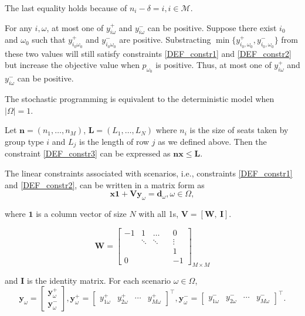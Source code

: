 
The last equality holds because of $n_i- \delta = i, i \in \mathcal{M}$. 

\begin{remark}
For any $i, \omega$, at most one of $y_{i \omega}^{+}$ and $y_{i \omega}^{-}$ can be positive. 
Suppose there exist $i_0$ and $\omega_0$ such that $y_{i_0 \omega_0}^{+}$ and $y_{i_0 \omega_0}^{-}$ are positive. Substracting $\min\{y_{i_0, \omega_0}^{+}, y_{i_0, \omega_0}^{-}\}$ from these two values will still satisfy constraints \eqref{DEF_constr1} and \eqref{DEF_constr2} but increase the objective value when $p_{\omega_0}$ is positive. Thus, at most one of $y_{i \omega}^{+}$ and $y_{i \omega}^{-}$ can be positive. 
\end{remark}

\begin{prop}\label{prop_onescenario}
  The stochastic programming is equivalent to the deterministic model when $|\Omega| =1$.
\end{prop}

Let $\mathbf{n} = (n_1, \ldots, n_M)$, $\mathbf{L} = (L_1, \ldots, L_N)$ where $n_i$ is the size of seats taken by group type $i$ and $L_j$ is the length of row $j$ as we defined above. Then the constraint \eqref{DEF_constr3} can be expressed as $\mathbf{n} \mathbf{x} \leq \mathbf{L}$.

The linear constraints associated with scenarios, i.e., constraints \eqref{DEF_constr1} and \eqref{DEF_constr2}, can be written in a matrix form as
\[\mathbf{x} \mathbf{1} + \mathbf{V} \mathbf{y}_\omega = \mathbf{d}_\omega, \omega\in \Omega,\]

where $\mathbf{1}$ is a column vector of size $N$ with all 1s, $\mathbf{V} = [\mathbf{W}, ~\mathbf{I}]$.

$$
\mathbf{W}=\left[\begin{array}{ccccc}
-1 & 1 & \ldots & & 0 \\
& \ddots & \ddots & & \vdots \\
& & & & 1 \\
0 & & & & -1
\end{array}\right]_{M \times M}
$$

and $\mathbf{I}$ is the identity matrix. For each scenario $\omega \in \Omega$,
$$
\mathbf{y}_{\omega}=\left[\begin{array}{l}
\mathbf{y}_{\omega}^{+} \\
\mathbf{y}_{\omega}^{-}
\end{array}\right], \mathbf{y}_{\omega}^{+}=\left[\begin{array}{lllll}y_{1 \omega}^{+} & y_{2 \omega}^{+} & \cdots & y_{M \omega}^{+}\end{array}\right]^{\intercal}, \mathbf{y}_{\omega}^{-}=\left[\begin{array}{llll}y_{1 \omega}^{-} & y_{2 \omega}^{-} & \cdots & y_{M \omega}^{-}\end{array}\right]^{\intercal}.
$$

